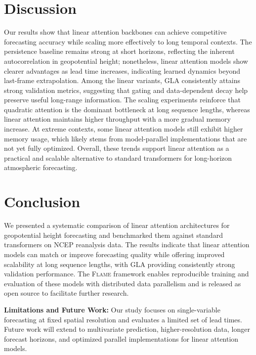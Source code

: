\documentclass[runningheads]{llncs}
\newcommand{\method}{\textsc{Flame}}
\begin{document}
\section{Discussion}
\label{sec:discussion}

Our results show that linear attention backbones can achieve competitive forecasting accuracy while scaling more effectively to long temporal contexts. The persistence baseline remains strong at short horizons, reflecting the inherent autocorrelation in geopotential height; nonetheless, linear attention models show clearer advantages as lead time increases, indicating learned dynamics beyond last-frame extrapolation. Among the linear variants, GLA consistently attains strong validation metrics, suggesting that gating and data-dependent decay help preserve useful long-range information. The scaling experiments reinforce that quadratic attention is the dominant bottleneck at long sequence lengths, whereas linear attention maintains higher throughput with a more gradual memory increase. At extreme contexts, some linear attention models still exhibit higher memory usage, which likely stems from model-parallel implementations that are not yet fully optimized. Overall, these trends support linear attention as a practical and scalable alternative to standard transformers for long-horizon atmospheric forecasting.

\section{Conclusion}
\label{sec:conclusion}

We presented a systematic comparison of linear attention architectures for geopotential height forecasting and benchmarked them against standard transformers on NCEP reanalysis data. The results indicate that linear attention models can match or improve forecasting quality while offering improved scalability at long sequence lengths, with GLA providing consistently strong validation performance. The \method{} framework enables reproducible training and evaluation of these models with distributed data parallelism and is released as open source to facilitate further research.

\textbf{Limitations and Future Work:} Our study focuses on single-variable forecasting at fixed spatial resolution and evaluates a limited set of lead times. Future work will extend to multivariate prediction, higher-resolution data, longer forecast horizons, and optimized parallel implementations for linear attention models.




\end{document}
